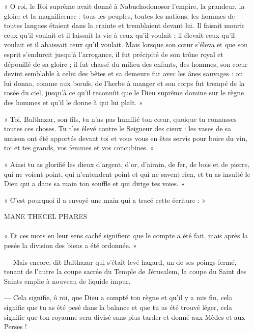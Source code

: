 \documentclass[a4paper, 11pt, oneside, polutonikogreek, french]{article}
\begin{document}
« O roi, le Roi suprême avait donné à Nabuchodonosor l'empire, la grandeur, la gloire et la magnificence : tous les peuples, toutes les nations, les hommes de toutes langues étaient dans la crainte et tremblaient devant lui. Il faisait mourir ceux qu'il voulait et il laissait la vie à ceux qu'il voulait ; il élevait ceux qu'il voulait et il abaissait ceux qu'il voulait. Mais lorsque son cœur s'éleva et que son esprit s'endurcit jusqu'à l'arrogance, il fut précipité de son trône royal et dépouillé de sa gloire ; il fut chassé du milieu des enfants, des hommes, son cœur devint semblable à celui des bêtes et sa demeure fut avec les ânes sauvages : on lui donna, comme aux bœufs, de l'herbe à manger et son corps fut trempé de la rosée du ciel, jusqu'à ce qu'il reconnût que le Dieu suprême domine sur le règne des hommes et qu'il le donne à qui lui plaît. »

« Toi, Balthazar, son fils, tu n'as pas humilié ton cœur, quoique tu connusses toutes ces choses. Tu t'es élevé contre le Seigneur des cieux : les vases de sa maison ont été apportés devant toi et vous vous en êtes servis pour boire du vin, toi et tes grands, vos femmes et vos concubines. »

« Ainsi tu as glorifié les dieux d'argent, d'or, d'airain, de fer, de bois et de pierre, qui ne voient point, qui n'entendent point et qui ne savent rien, et tu as insulté le Dieu qui a dans sa main ton souffle et qui dirige tes voies. »

« C'est pourquoi il a envoyé une main qui a tracé cette écriture : »

\begin{center}
MANE THECEL PHARES
\end{center}
\paragraph{}
« Et ces mots en leur sens caché signifient que le compte a été fait, mais après la pesée la division des biens a été ordonnée. »

--- Mais encore, dit Balthazar qui s'était levé hagard, un de ses poings fermé, tenant de l'autre la coupe sacrée du Temple de Jérusalem, la coupe du Saint des Saints emplie à nouveau de liquide impur.

--- Cela signifie, ô roi, que Dieu a compté ton règne et qu'il y a mis fin, cela signifie que tu as été pesé dans la balance et que tu as été trouvé léger, cela signifie que ton royaume sera divisé sans plus tarder et donné aux Mèdes et aux Perses !
\end{document}

